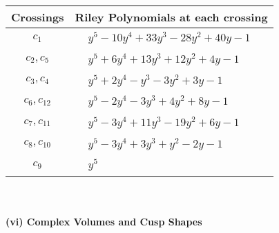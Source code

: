 \documentclass[1p]{elsarticle_modified}
\theoremstyle{definition}
\begin{document}
\begin{tabular}{m{50pt}|m{274pt}}
Crossings & \hspace{64pt}Riley Polynomials at each crossing \\
\hline $$\begin{aligned}c_{1}\end{aligned}$$&$\begin{aligned}
&y^5-10 y^4+33 y^3-28 y^2+40 y-1
\end{aligned}$\\
\hline $$\begin{aligned}c_{2},c_{5}\end{aligned}$$&$\begin{aligned}
&y^5+6 y^4+13 y^3+12 y^2+4 y-1
\end{aligned}$\\
\hline $$\begin{aligned}c_{3},c_{4}\end{aligned}$$&$\begin{aligned}
&y^5+2 y^4- y^3-3 y^2+3 y-1
\end{aligned}$\\
\hline $$\begin{aligned}c_{6},c_{12}\end{aligned}$$&$\begin{aligned}
&y^5-2 y^4-3 y^3+4 y^2+8 y-1
\end{aligned}$\\
\hline $$\begin{aligned}c_{7},c_{11}\end{aligned}$$&$\begin{aligned}
&y^5-3 y^4+11 y^3-19 y^2+6 y-1
\end{aligned}$\\
\hline $$\begin{aligned}c_{8},c_{10}\end{aligned}$$&$\begin{aligned}
&y^5-3 y^4+3 y^3+y^2-2 y-1
\end{aligned}$\\
\hline $$\begin{aligned}c_{9}\end{aligned}$$&$\begin{aligned}
&y^5
\end{aligned}$\\
\hline
\end{tabular}\\~\\
\newpage\flushleft \textbf{(vi) Complex Volumes and Cusp Shapes}
\end{document}
